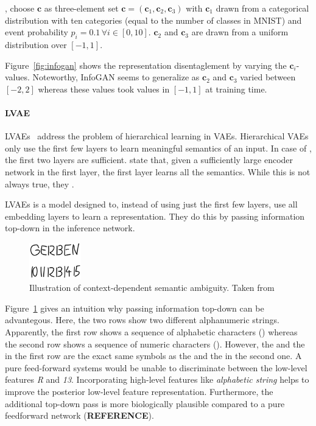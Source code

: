 , \citet{chen2016infogan} choose $\bm{c}$ as three-element set $\bm{c} = (\bm{c}_1, \bm{c}_2, \bm{c}_3)$ with $\bm{c}_1$ drawn from a categorical distribution with ten categories (equal to the number of classes in MNIST) and event probability $p_i=0.1 \, \forall i \in [0, 10]$.
$\bm{c}_2$ and $\bm{c}_3$ are drawn from a uniform distribution over $[-1, 1]$.

Figure~\ref{fig:infogan} shows the representation disentaglement by varying the $\bm{c}_i$-values.
Noteworthy, InfoGAN seems to generalize as $\bm{c}_2$ and $\bm{c}_3$ varied between $[-2, 2]$ whereas these values took values in $[-1, 1]$ at training time.

\paragraph{\acl{LVAE}}

\aclp{LVAE}~\citep{sonderby2016ladder} address the problem of hierarchical learning in \acp{VAE}.
Hierarchical \acp{VAE} only use the first few layers to learn meaningful semantics of an input.
In case of \citet{sonderby2016ladder}, the first two layers are sufficient.
\citet{zhao2017learning} state that, given a sufficiently large encoder network in the first layer, the first layer learns all the semantics.
While this is not always true, they .

\acp{LVAE} is a model designed to, instead of using just the first few layers, use all embedding layers to learn a representation.
They do this by passing information top-down in the inference network.
\begin{figure}
    \centering
    \includegraphics[width=0.2\textwidth]{images/gerben.png}
    \caption{Illustration of context-dependent semantic ambiguity. Taken from \citet[p. 61]{van2016auto}}
    \label{fig:gerben_ambiguity}
\end{figure}
Figure~\ref{fig:gerben_ambiguity} gives an intuition why passing information top-down can be advantegous.
Here, the two rows show two different alphanumeric strings.
Apparently, the first row shows a sequence of alphabetic characters () whereas the second row shows a sequence of numeric characters ().
However, the  and the  in the first row are the exact same symbols as the  and the  in the second one.
A pure feed-forward systems would be unable to discriminate between the low-level features \textit{R} and \textit{13}.
Incorporating high-level features like \textit{alphabetic string} helps to improve the posterior low-level feature representation.
Furthermore, the additional top-down pass is more biologically plausible compared to a pure feedforward network (\textbf{REFERENCE}).

